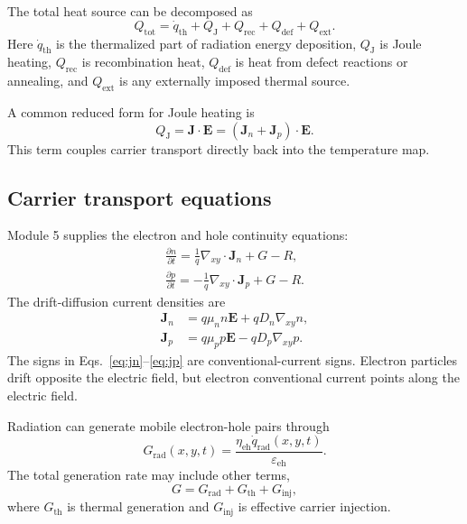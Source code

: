\documentclass[11pt]{article}
\newcommand{\Evec}{\bm{E}}
\newcommand{\Jvec}{\bm{J}}
\newcommand{\gradxy}{\nabla_{xy}}
\newcommand{\divxy}{\nabla_{xy}\cdot}
\begin{document}
The total heat source can be decomposed as
\begin{equation}
\boxed{
Q_{\mathrm{tot}}
=
\dot{q}_{\mathrm{th}}
+Q_{\mathrm{J}}
+Q_{\mathrm{rec}}
+Q_{\mathrm{def}}
+Q_{\mathrm{ext}}.}
\label{eq:thermal_sources}
\end{equation}
Here \(\dot{q}_{\mathrm{th}}\) is the thermalized part of radiation energy deposition, \(Q_{\mathrm{J}}\) is Joule heating, \(Q_{\mathrm{rec}}\) is recombination heat, \(Q_{\mathrm{def}}\) is heat from defect reactions or annealing, and \(Q_{\mathrm{ext}}\) is any externally imposed thermal source.

A common reduced form for Joule heating is
\begin{equation}
\boxed{
Q_{\mathrm{J}} = \Jvec\cdot\Evec = (\Jvec_n+\Jvec_p)\cdot\Evec.}
\label{eq:joule}
\end{equation}
This term couples carrier transport directly back into the temperature map.

\subsection{Carrier transport equations}

Module 5 supplies the electron and hole continuity equations:
\begin{align}
\boxed{
\frac{\partial n}{\partial t}
=
\frac{1}{q}\divxy \Jvec_n+G-R,}
\label{eq:n_continuity}\\
\boxed{
\frac{\partial p}{\partial t}
=
-
\frac{1}{q}\divxy \Jvec_p+G-R.}
\label{eq:p_continuity}
\end{align}
The drift-diffusion current densities are
\begin{align}
\Jvec_n &= q\mu_n n\Evec + qD_n\gradxy n, \label{eq:jn}\\
\Jvec_p &= q\mu_p p\Evec - qD_p\gradxy p. \label{eq:jp}
\end{align}
The signs in Eqs.~\eqref{eq:jn}--\eqref{eq:jp} are conventional-current signs. Electron particles drift opposite the electric field, but electron conventional current points along the electric field.

Radiation can generate mobile electron-hole pairs through
\begin{equation}
\boxed{
G_{\mathrm{rad}}(x,y,t)
=
\frac{\eta_{\mathrm{eh}}\dot{q}_{\mathrm{rad}}(x,y,t)}{\varepsilon_{\mathrm{eh}}}.}
\label{eq:carrier_generation_from_qrad}
\end{equation}
The total generation rate may include other terms,
\begin{equation}
G=G_{\mathrm{rad}}+G_{\mathrm{th}}+G_{\mathrm{inj}},
\end{equation}
where \(G_{\mathrm{th}}\) is thermal generation and \(G_{\mathrm{inj}}\) is effective carrier injection.
\end{document}
